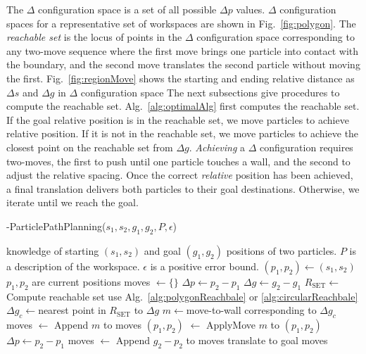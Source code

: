 The $\Delta$ configuration space is a set of all possible $\Delta p$ values.
 $\Delta$ configuration spaces for a representative set of workspaces are shown in Fig.~\ref{fig:polygon}. The \emph{reachable set} is the locus of points in the $\Delta$ configuration space corresponding to any two-move sequence where the first move brings one particle into contact with the boundary, and the second move translates the second particle without moving the first.
 Fig.~\ref{fig:regionMove} shows the starting and ending relative distance as $\Delta s$ and $\Delta g$ in $\Delta$ configuration space%
 The next subsections give procedures to compute the reachable set.
 Alg.~\ref{alg:optimalAlg} first computes the reachable set. If the goal relative position is in the reachable set, we move particles to achieve relative position. If it is not in the reachable set, we move particles to achieve the closest point on the reachable set from $\Delta g$. 
 \emph{Achieving} a $\Delta$ configuration requires two-moves, the first to push until one particle touches a wall, and the second to adjust the relative spacing.
 Once the correct \emph{relative} position has been achieved, a final translation delivers both particles to their goal destinations. %
 Otherwise, we iterate until we reach the goal. 
\begin{algorithm}[htb]
\caption{ { -ParticlePathPlanning}($s_1,s_2,g_1,g_2,P,\epsilon$)}\label{alg:optimalAlg}
\begin{algorithmic}[1]
\Require knowledge of starting $(s_1,s_2)$ and goal $(g_1,g_2)$ positions of  two particles. 
 $P$ is a description of the workspace. $\epsilon$ is a positive error bound.
 \State $(p_1,p_2) \gets (s_1,s_2) $ \Comment $p_1 , p_2$ are current positions
\State  moves $\gets \{\}$
 \State $\Delta p \gets p_2-p_1$
 \State $\Delta g \gets g_2-g_1$
\State $R_{\textrm{SET}}\gets$  Compute reachable set  \Comment use Alg.~\ref{alg:polygonReachbale} or \ref{alg:circularReachbale}
\State $ \Delta g_c\gets $nearest point in $R_{\textrm{SET}}$ to $\Delta g$
\State $m \gets $move-to-wall corresponding to $\Delta g_c$
\State moves $\gets$ Append $m$ to moves
\State $(p_1, p_2)$ $\gets$ ApplyMove $m$ to $(p_1,p_2)$
 \State $\Delta p \gets p_2-p_1$
\EndWhile
\State moves $\gets$ Append $g_2-p_2$ to moves \Comment translate to goal
\State \Return moves
\end{algorithmic}
\end{algorithm}


